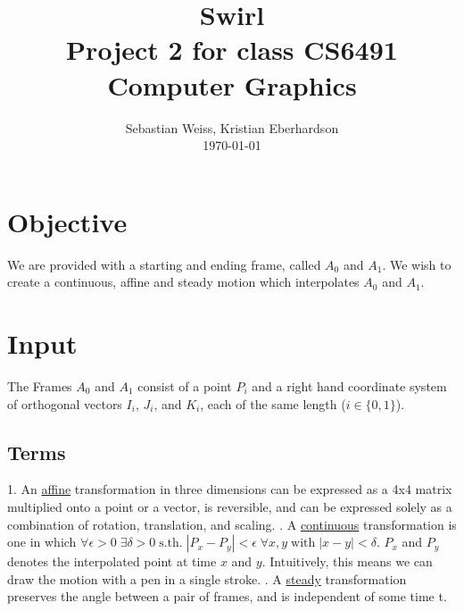 \documentclass[journal, letterpaper]{IEEEtran}
\begin{document}
\title{Swirl \\
	{\large Project 2 for class CS6491 Computer Graphics}}
\author{Sebastian Weiss, Kristian Eberhardson\\ \today}

\maketitle


\section{Objective}
We are provided with a starting and ending frame, called $A_0$ and $A_1$. We wish to create a continuous, affine and steady motion which interpolates $A_0$ and $A_1$.
 
\section{Input}
The Frames $A_0$ and $A_1$ consist of a point $P_i$ and a right hand coordinate system of orthogonal vectors $I_i$, $J_i$, and $K_i$, each of the same length ($i \in \{0,1\}$).
\subsection{Terms} 
1. An \underline{affine} transformation in three dimensions can be expressed as a 4x4 matrix multiplied onto a point or a vector, is reversible, and can be expressed solely as a combination of rotation, translation, and scaling.
. A \underline{continuous} transformation is one in which $\forall \epsilon>0 \; \exists \delta>0 \; \text{s.th.} \; |P_x - P_y|<\epsilon \; \forall x,y \; \text{with} \; |x-y|<\delta$. $P_x$ and $P_y$ denotes the interpolated point at time $x$ and $y$. Intuitively, this means we can draw the motion with a pen in a single stroke.
. A \underline{steady} transformation preserves the angle between a pair of frames, and is independent of some time t. 
\end{document}
